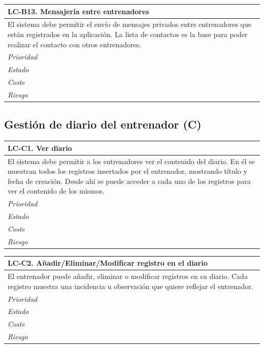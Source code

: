 	\begin{center}
		\begin{tabularx}{15cm}{|X|}
			\hline 
				\bf{LC-B13. Mensajería entre entrenadores}\\
			\hline
				El sistema debe permitir el envío de mensajes privados entre entrenadores que están registrados en la aplicación. La lista de contactos es la base para poder realizar el contacto con otros entrenadores.\\
			\hline
				\it{Prioridad}\\
			\hline
				\it{Estado}\\
			\hline
				\it{Coste}\\
			\hline
				\it{Riesgo}\\
			\hline
		\end{tabularx}
	\end{center}

%
%
\subsection{Gestión de diario del entrenador (C)} %
	\label{sub:gestion_diario_entrenador}

	\begin{center}
		\begin{tabularx}{15cm}{|X|}
			\hline 
				\bf{LC-C1. Ver diario}\\
			\hline
				El sistema debe permitir a los entrenadores ver el contenido del diario. En él se muestran todos los registros insertados por el entrenador, mostrando título y fecha de creación. Desde ahí se puede acceder a cada uno de los registros para ver el contenido de los mismos.\\
			\hline
				\it{Prioridad}\\
			\hline
				\it{Estado}\\
			\hline
				\it{Coste}\\
			\hline
				\it{Riesgo}\\
			\hline
		\end{tabularx}
	\end{center}
	
	\begin{center}
		\begin{tabularx}{15cm}{|X|}
			\hline 
				\bf{LC-C2. Añadir/Eliminar/Modificar registro en el diario}\\
			\hline
				El entrenador puede añadir, eliminar o modificar registros en su diario. Cada registro muestra una incidencia u observación que quiere reflejar el entrenador.\\
			\hline
				\it{Prioridad}\\
			\hline
				\it{Estado}\\
			\hline
				\it{Coste}\\
			\hline
				\it{Riesgo}\\
			\hline
		\end{tabularx}
	\end{center}
	
